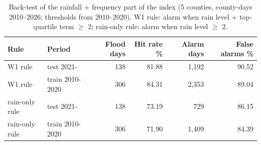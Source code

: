 \begin{table}[H]\centering\footnotesize
\caption{Back-test of the rainfall + frequency part of the index (5 counties, county-days 2010--2026; thresholds from 2010--2020). W1 rule: alarm when rain level + top-quartile term $\geq$ 2; rain-only rule: alarm when rain level $\geq$ 2.}\label{tab:backtest}
\begin{tabular}{@{}llrrrr@{}}\toprule
Rule & Period & Flood days & Hit rate \% & Alarm days & False alarms \%\\\midrule
W1 rule & test 2021- & 138 & 81.88 & 1,192 & 90.52\\
W1 rule & train 2010-2020 & 306 & 84.31 & 2,353 & 89.04\\
rain-only rule & test 2021- & 138 & 73.19 & 729 & 86.15\\
rain-only rule & train 2010-2020 & 306 & 71.90 & 1,409 & 84.39\\
\bottomrule\end{tabular}\end{table}